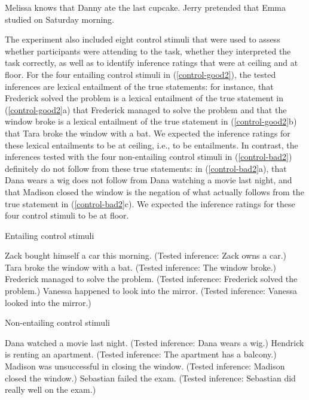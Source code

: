 \documentclass[11pt,fleqn]{article}
\newcommand{\6}{\mbox{$[\hspace*{-.6mm}[$}}
\newcommand{\9}{\mbox{$]\hspace*{-.6mm}]$}}
\begin{document}
\begin{exe}
\ex\label{stims2}
\begin{xlist}
 Melissa knows that Danny ate the last cupcake.
 Jerry pretended that Emma studied on Saturday morning.
\end{xlist}
\end{exe}

The experiment also included eight control stimuli that were used to assess whether participants were attending to the task, whether they interpreted the task correctly, as well as to identify inference ratings that were at ceiling and at floor. For the four entailing control stimuli in (\ref{control-good2}), the tested inferences are lexical entailment of the true statements: for instance, that Frederick solved the problem is a lexical entailment of the true statement in (\ref{control-good2}a) that Frederick managed to solve the problem and that the window broke is a lexical entailment of the true statement in (\ref{control-good2}b) that Tara broke the window with a bat. We expected the inference ratings for these lexical entailments to be at ceiling, i.e., to be entailments. In contrast, the inferences tested with the four non-entailing control stimuli in (\ref{control-bad2}) definitely do not follow from these true statements: in (\ref{control-bad2}a), that Dana wears a wig does not follow from Dana watching a movie last night, and that Madison closed the window is the negation of what actually follows from the true statement in (\ref{control-bad2}c). We expected the inference ratings for these four control stimuli to be at floor.

\begin{exe}
\ex\label{control-good2} Entailing control stimuli
\begin{xlist}
 Zack bought himself a car this morning. (Tested inference: Zack owns a car.)
 Tara broke the window with a bat. (Tested inference: The window broke.)
 Frederick managed to solve the problem. (Tested inference: Frederick solved the problem.)
 Vanessa happened to look into the mirror. (Tested inference: Vanessa looked into the mirror.)
\end{xlist}
\ex\label{control-bad2} Non-entailing control stimuli
\begin{xlist}
 Dana watched a movie last night. (Tested inference: Dana wears a wig.)
 Hendrick is renting an apartment. (Tested inference: The apartment has a balcony.)
 Madison was unsuccessful in closing the window. (Tested inference:  Madison closed the window.)
 Sebastian failed the exam. (Tested inference: Sebastian did really well on the exam.)
\end{xlist}
\end{exe}
\end{document}
